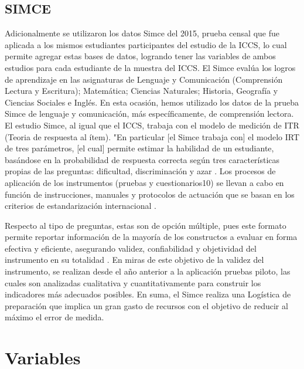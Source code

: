 \documentclass[12pt,twoside]{templates/facsothesis}
\begin{document}
\hypertarget{simce}{%
\subsection{SIMCE}\label{simce}}

Adicionalmente se utilizaron los datos Simce del 2015, prueba censal que fue aplicada a los mismos estudiantes participantes del estudio de la ICCS, lo cual permite agregar estas bases de datos, logrando tener las variables de ambos estudios para cada estudiante de la muestra del ICCS. El Simce evalúa los logros de aprendizaje en las asignaturas de Lenguaje y Comunicación (Comprensión Lectura y Escritura); Matemática; Ciencias Naturales; Historia, Geografía y Ciencias Sociales e Inglés. En esta ocasión, hemos utilizado los datos de la prueba Simce de lenguaje y comunicación, más específicamente, de comprensión lectora. El estudio Simce, al igual que el ICCS, trabaja con el modelo de medición de ITR (Teoria de respuesta al ítem). "En particular {[}el Simce trabaja con{]} el modelo IRT de tres parámetros, {[}el cual{]} permite estimar la habilidad de un estudiante, basándose en la probabilidad de respuesta correcta según tres características propias de las preguntas: dificultad, discriminación y azar \citep{aceInformeTecnicoSimce2018}. Los procesos de aplicación de los instrumentos (pruebas y cuestionarios10) se llevan a cabo en función de instrucciones, manuales y protocolos de actuación que se basan en los criterios de estandarización internacional \citep{aeraReportRecommendationsReauthorization2011}.

Respecto al tipo de preguntas, estas son de opción múltiple, pues este formato permite reportar información de la mayoría de los constructos a evaluar en forma efectiva y eficiente, asegurando validez, confiabilidad y objetividad del instrumento en su totalidad \citep{ruppHandbookTestDevelopment2008}. En miras de este objetivo de la validez del instrumento, se realizan desde el año anterior a la aplicación pruebas piloto, las cuales son analizadas cualitativa y cuantitativamente para construir los indicadores más adecuados posibles. En suma, el Simce realiza una Logística de preparación que implica un gran gasto de recursos con el objetivo de reducir al máximo el error de medida.

\hypertarget{variables}{%
\section{Variables}\label{variables}}
\end{document}
